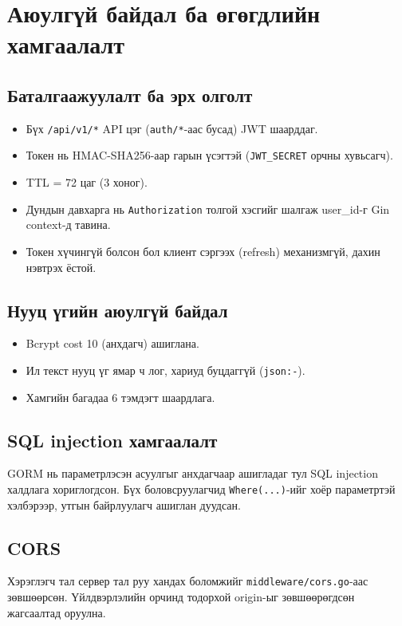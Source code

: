 \section{Аюулгүй байдал ба өгөгдлийн хамгаалалт}

\subsection{Баталгаажуулалт ба эрх олголт}
\begin{itemize}
    \item Бүх \texttt{/api/v1/*} API цэг (\texttt{auth/*}-аас бусад) JWT шаарддаг.
    \item Токен нь HMAC-SHA256-аар гарын үсэгтэй (\texttt{JWT\_SECRET} орчны хувьсагч).
    \item TTL = 72 цаг (3 хоног).
    \item Дундын давхарга нь \texttt{Authorization} толгой хэсгийг шалгаж user\_id-г Gin context-д тавина.
    \item Токен хүчингүй болсон бол клиент сэргээх (refresh) механизмгүй, дахин нэвтрэх ёстой.
\end{itemize}

\subsection{Нууц үгийн аюулгүй байдал}
\begin{itemize}
    \item Bcrypt cost 10 (анхдагч) ашиглана.
    \item Ил текст нууц үг ямар ч лог, хариуд буцдаггүй (\texttt{json:\textquotedbl-\textquotedbl}).
    \item Хамгийн багадаа 6 тэмдэгт шаардлага.
\end{itemize}

\subsection{SQL injection хамгаалалт}
GORM нь параметрлэсэн асуулгыг анхдагчаар ашигладаг тул SQL injection халдлага хориглогдсон. Бүх боловсруулагчид \texttt{Where(...)}-ийг хоёр параметртэй хэлбэрээр, утгын байрлуулагч ашиглан дуудсан.

\subsection{CORS}
Хэрэглэгч тал сервер тал руу хандах боломжийг \texttt{middleware/cors.go}-аас зөвшөөрсөн. Үйлдвэрлэлийн орчинд тодорхой origin-ыг зөвшөөрөгдсөн жагсаалтад оруулна.

